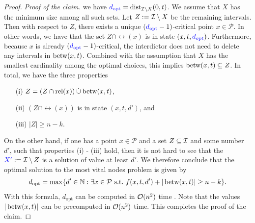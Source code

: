 \begin{proof}
\emph{Proof of the claim.}  we have $\textcolor{blue}{d_\text{opt}} = \operatorname{\text{dist}}_{\mathcal{I} \setminus X}(0, t)$.
We assume  that $X$ has the minimum size among all such sets. 
Let $Z := \mathcal{I} \setminus X$ be the remaining intervals. Then with respect to $Z$, there exists a unique $(\textcolor{blue}{d_\text{opt}} - 1)$-critical point $x \in \mathcal{P}$. 
In other words, we have that the set $Z \cap \rel(x)$ is in state $(x, t, \textcolor{blue}{d_\text{opt}})$. 
Furthermore, because $x$ is already $(\textcolor{blue}{d_\text{opt}} - 1)$-critical, the interdictor does not need to delete any intervals in $\operatorname{\text{betw}}(x, t)$. 
Combined with the assumption that $X$ has the smallest cardinality among the optimal choices, this implies $\operatorname{\text{betw}}(x, t) \subseteq Z$. In total,  we have the three properties 
\begin{itemize}
\item[(i)] $Z = (Z \cap \operatorname{\text{rel}}(x)) \mathbin{\dot{\cup}} \operatorname{\text{betw}}(x, t)$,
\item[(ii)] $(Z \cap \rel(x))$ is in state $(x, t, d')$, and
\item[(iii)] $|Z| \geq n - k$.
\end{itemize}
On the other hand, if one has a point $x \in \mathcal{P}$ and a set $Z \subseteq \mathcal{I}$ and some number $d'$, such that properties (i) - (iii) hold, then it is not hard to see that  the  $\textcolor{blue}{X'} := \mathcal{I} \setminus Z$ is a solution of  value at least $d'$. We therefore conclude that the optimal solution to the most vital nodes problem is given by
\[
d_{\text{opt}} =  \max\{ d' \in \mathbb{N} : \exists x \in \mathcal{P} \text{ s.t.\ } f(x,t,d') + |\operatorname{\text{betw}}(x, t)| \geq n - k \}.
\]
With this formula, $d_{\text{opt}}$ can be computed in $\mathcal{O}(n^2)$ time . 
Note that the values $|\operatorname{\text{betw}}(x,t)|$ can be precomputed in $\mathcal{O}(n^2)$ time.
This completes the proof of the claim.
\claimqed




\end{proof}
